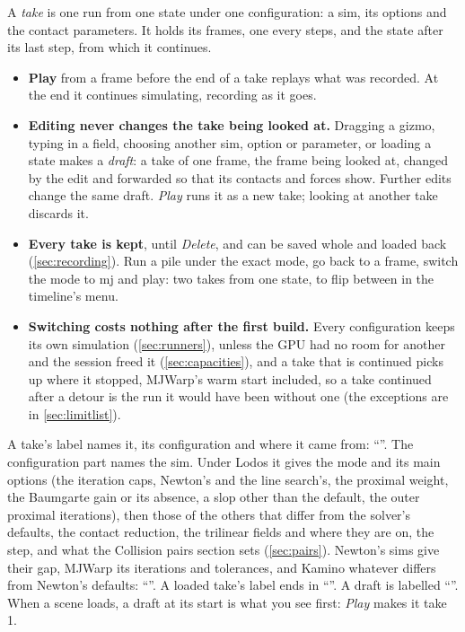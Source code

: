 A \emph{take} is one run from one state under one configuration: a sim, its options and the contact parameters. It holds its frames, one every  steps, and the state after its last step, from which it continues.

\begin{itemize}
\item \textbf{Play} from a frame before the end of a take replays what was recorded. At the end it continues simulating, recording as it goes.
\item \textbf{Editing never changes the take being looked at.} Dragging a gizmo, typing in a field, choosing another sim, option or parameter, or loading a state makes a \emph{draft}: a take of one frame, the frame being looked at, changed by the edit and forwarded so that its contacts and forces show. Further edits change the same draft. \emph{Play} runs it as a new take; looking at another take discards it.
\item \textbf{Every take is kept}, until \emph{Delete}, and can be saved whole and loaded back (\cref{sec:recording}). Run a pile under the exact mode, go back to a frame, switch the mode to mj and play: two takes from one state, to flip between in the timeline's menu.
\item \textbf{Switching costs nothing after the first build.} Every configuration keeps its own simulation (\cref{sec:runners}), unless the GPU had no room for another and the session freed it (\cref{sec:capacities}), and a take that is continued picks up where it stopped, MJWarp's warm start included, so a take continued after a detour is the run it would have been without one (the exceptions are in \cref{sec:limitlist}).
\end{itemize}

A take's label names it, its configuration and where it came from: ``''. The configuration part names the sim. Under Lodos it gives the mode and its main options (the iteration caps, Newton's and the line search's, the proximal weight, the Baumgarte gain or its absence, a slop other than the default, the outer proximal iterations), then those of the others that differ from the solver's defaults, the contact reduction, the trilinear fields and  where they are on, the step, and what the Collision pairs section sets (\cref{sec:pairs}). Newton's sims give their gap, MJWarp its iterations and tolerances, and Kamino whatever differs from Newton's defaults: ``''. A loaded take's label ends in ``''. A draft is labelled ``''. When a scene loads, a draft at its start is what you see first: \emph{Play} makes it take 1.

